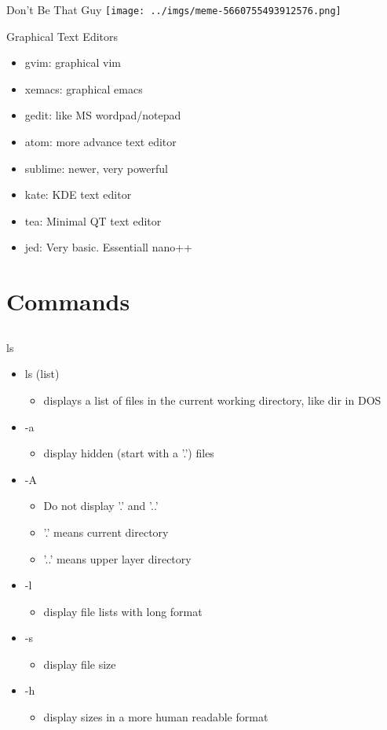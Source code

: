 \documentclass{beamer}
\begin{document}
\begin{frame}{Don't Be That Guy}
\texttt{[image: ../imgs/meme-5660755493912576.png]}
\end{frame}

\begin{frame}{Graphical Text Editors}
\begin{itemize}
\item gvim: graphical vim
\item xemacs: graphical emacs
\item gedit: like MS wordpad/notepad
\item atom: more advance text editor
\item sublime: newer, very powerful
\item kate: KDE text editor
\item tea: Minimal QT text editor
\item jed: Very basic.  Essentiall nano++
\end{itemize}
\end{frame}

\section{Commands}
\subsection{}
\begin{frame} {ls}
\begin{itemize}
\item ls (list)
\begin{itemize}
\item displays a list of files in the current working directory, like dir in DOS
\end{itemize}
\item -a 
\begin{itemize}
\item display hidden (start with a '.') files
\end{itemize}
\item -A
\begin{itemize}
\item Do not display '.' and '..'
\item '.' means current directory
\item '..' means upper layer directory
\end{itemize}
\item -l
\begin{itemize}
\item display file lists with long format
\end{itemize}
\item -s
\begin{itemize}
\item display file size
\end{itemize}
\item -h
\begin{itemize}
\item display sizes in a more human readable format
\end{itemize}
\end{itemize}
\end{frame}
\end{document}
